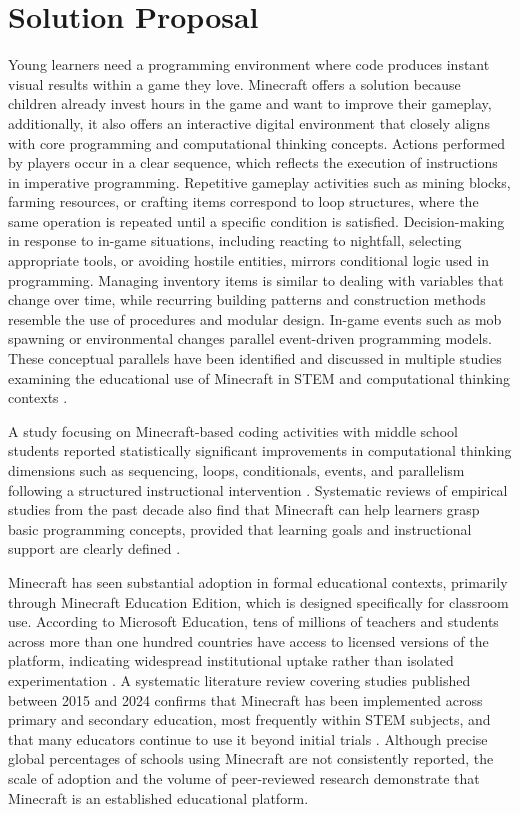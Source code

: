 \section{Solution Proposal}

Young learners need a programming environment where code produces instant visual results within a game they love. 
Minecraft offers a solution because children already invest hours in the game and want to improve their gameplay, additionally, it also offers an interactive digital environment that closely aligns with core programming and computational thinking concepts. 
Actions performed by players occur in a clear sequence, which reflects the execution of instructions in imperative programming. 
Repetitive gameplay activities such as mining blocks, farming resources, or crafting items correspond to loop structures, where the same operation is repeated until a specific condition is satisfied. 
Decision-making in response to in-game situations, including reacting to nightfall, selecting appropriate tools, or avoiding hostile entities, mirrors conditional logic used in programming. 
Managing inventory items is similar to dealing with variables that change over time, while recurring building patterns and construction methods resemble the use of procedures and modular design. 
In-game events such as mob spawning or environmental changes parallel event-driven programming models. 
These conceptual parallels have been identified and discussed in multiple studies examining the educational use of Minecraft in STEM and computational thinking contexts \cite{md_shamsudin_crafting_2024, nebel_mining_2016}.

A study focusing on Minecraft-based coding activities with middle school students reported statistically significant improvements in computational thinking dimensions such as sequencing, loops, conditionals, events, and parallelism following a structured instructional intervention \cite{tablatin_using_2023}. 
Systematic reviews of empirical studies from the past decade also find that Minecraft can help learners grasp basic programming concepts, provided that learning goals and instructional support are clearly defined \cite{nebel_mining_2016, md_shamsudin_crafting_2024}.

Minecraft has seen substantial adoption in formal educational contexts, primarily through Minecraft Education Edition, which is designed specifically for classroom use. 
According to Microsoft Education, tens of millions of teachers and students across more than one hundred countries have access to licensed versions of the platform, indicating widespread institutional uptake rather than isolated experimentation \cite{noauthor_licensing_nodate}. 
A systematic literature review covering studies published between 2015 and 2024 confirms that Minecraft has been implemented across primary and secondary education, most frequently within STEM subjects, and that many educators continue to use it beyond initial trials \cite{md_shamsudin_crafting_2024}. 
Although precise global percentages of schools using Minecraft are not consistently reported, the scale of adoption and the volume of peer-reviewed research demonstrate that Minecraft is an established educational platform.

